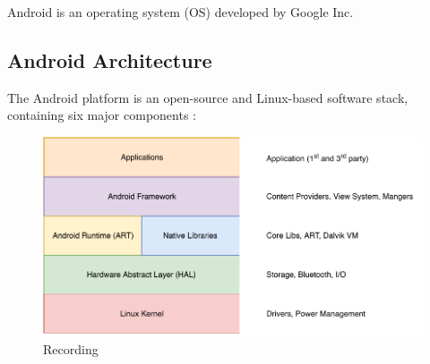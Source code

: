Android is an operating system (OS) developed by Google Inc.


\subsection{Android Architecture}
The Android platform is an open-source and Linux-based software stack, containing six major components \cite{androidplatform}: 

\begin{figure}
    \centering
    \includegraphics[scale=0.85]{images/Android.pdf}
    \caption{Recording}
    \label{fig:hta_recording}
\end{figure}


